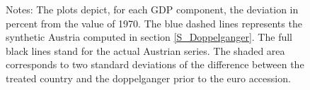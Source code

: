 \documentclass[12pt]{article}
\newcommand{\annote}[1]{\parbox{\textwidth}{\renewcommand{\baselinestretch}{1.0}\vspace{12pt} \small Notes: #1}}
\begin{document}
\begin{figure}[h!]
    \annote{The plots depict, for each GDP component, the deviation in percent from the value of 1970. The blue dashed lines represents the synthetic Austria computed in section \ref{S_Doppelganger}. The full black lines stand for the actual Austrian series. The shaded area corresponds to two standard deviations of the difference between the treated country and the doppelganger prior to the euro accession.}
\end{figure}
\end{document}
